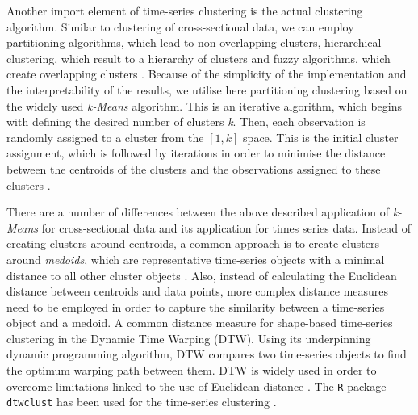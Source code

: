 \documentclass[]{interact}
\theoremstyle{plain}%
\theoremstyle{definition}
\theoremstyle{remark}
\begin{document}
Another import element of time-series clustering is the actual
clustering algorithm. Similar to clustering of cross-sectional data, we
can employ partitioning algorithms, which lead to non-overlapping
clusters, hierarchical clustering, which result to a hierarchy of
clusters and fuzzy algorithms, which create overlapping clusters
\citep{sardatime}. Because of the simplicity of the implementation and
the interpretability of the results, we utilise here partitioning
clustering based on the widely used \emph{k-Means} algorithm. This is an
iterative algorithm, which begins with defining the desired number of
clusters \emph{k}. Then, each observation is randomly assigned to a
cluster from the \([1,k]\) space. This is the initial cluster
assignment, which is followed by iterations in order to minimise the
distance between the centroids of the clusters and the observations
assigned to these clusters \citep{james2013introduction}.

There are a number of differences between the above described
application of \emph{k-Means} for cross-sectional data and its
application for times series data. Instead of creating clusters around
centroids, a common approach is to create clusters around
\emph{medoids}, which are representative time-series objects with a
minimal distance to all other cluster objects \citep{sardatime}. Also,
instead of calculating the Euclidean distance between centroids and data
points, more complex distance measures need to be employed in order to
capture the similarity between a time-series object and a medoid. A
common distance measure for shape-based time-series clustering in the
Dynamic Time Warping (DTW). Using its underpinning dynamic programming
algorithm, DTW compares two time-series objects to find the optimum
warping path between them. DTW is widely used in order to overcome
limitations linked to the use of Euclidean distance
\citep{sardatime, berndt1994using, ratanamahatana2004everything}. The
\texttt{R} package \texttt{dtwclust} has been used for the time-series
clustering \citep{dtwclust}.
\end{document}

